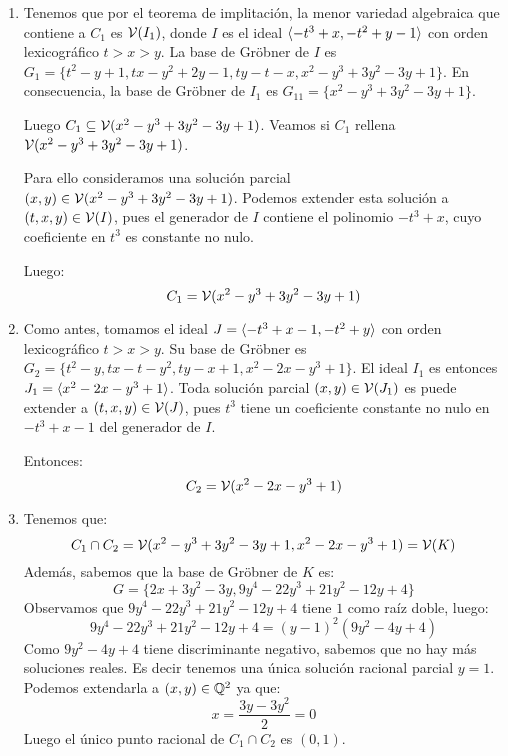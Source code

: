 \documentclass[twoside]{article}
\begin{document}
\begin{solucion}
\mbox{}
\begin{enumerate}
\item Tenemos que por el teorema de implitación, la menor variedad algebraica que contiene a $C_1$ es $\mathcal{V}(I_1)$, donde $I$ es el ideal $\langle{-t^3 + x, -t^2+y-1}\rangle$ con orden lexicográfico $t > x > y$.
La base de Gröbner de $I$ es $G_1 = \{t^2-y+1, tx-y^2+2y-1, ty-t-x, x^2-y^3+3y^2-3y+1\}$.
En consecuencia, la base de Gröbner de $I_1$ es $G_{11} = \{x^2-y^3+3y^2-3y+1\}$.

Luego $C_1 \subseteq \mathcal{V}(x^2-y^3+3y^2-3y+1)$.
Veamos si $C_1$ rellena $\mathcal{V}(x^2-y^3+3y^2-3y+1)$.

Para ello consideramos una solución parcial $(x,y) \in \mathcal{V}(x^2-y^3+3y^2-3y+1)$.
Podemos extender esta solución a $(t,x,y) \in \mathcal{V}(I)$, pues el generador de $I$ contiene el polinomio $-t^3+x$, cuyo coeficiente en $t^3$ es constante no nulo.

Luego:
\[ C_1 = \mathcal{V}(x^2-y^3+3y^2-3y+1)\]

\item Como antes, tomamos el ideal $J=\langle{-t^3 + x - 1, -t^2 + y}\rangle$ con orden lexicográfico $t > x > y$.
Su base de Gröbner es $G_2 = \{t^2-y, tx-t-y^2, ty-x+1, x^2-2x-y^3+1\}$.
El ideal $I_1$ es entonces $J_1 = \langle{x^2-2x-y^3+1}\rangle$.
Toda solución parcial $(x,y) \in \mathcal{V}(J_1)$ es puede extender a $(t,x,y) \in \mathcal{V}(J)$, pues $t^3$ tiene un coeficiente constante no nulo en $-t^3+x-1$ del generador de $I$.

Entonces:
\[ C_2 = \mathcal{V}(x^2-2x-y^3+1) \]

\item Tenemos que:
\[ C_1 \cap C_2 = \mathcal{V}(x^2-y^3+3y^2-3y+1, x^2-2x-y^3+1) = \mathcal{V}(K) \]
Además, sabemos que la base de Gröbner de $K$ es:
\[ G = \{2x+3y^2-3y, 9y^4-22y^3 + 21y^2 - 12y + 4\} \]
Observamos que $9y^4-22y^3+21y^2-12y+4$ tiene $1$ como raíz doble, luego:
\[ 9y^4-22y^3+21y^2-12y+4 = (y-1)^2 (9y^2 - 4y + 4)\]
Como $9y^2-4y+4$ tiene discriminante negativo, sabemos que no hay más soluciones reales.
Es decir tenemos una única solución racional parcial $y=1$.
Podemos extendarla a $(x,y) \in \mathbb{Q}^2$ ya que:
\[ x = \frac{3y-3y^2}{2} = 0 \]
Luego el único punto racional de $C_1 \cap C_2$ es $(0,1)$.

\end{enumerate}
\end{solucion}
\end{document}
